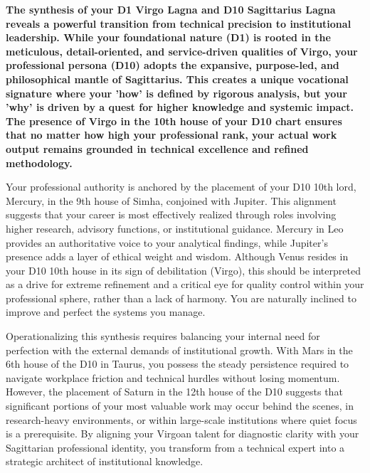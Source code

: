 
\label{topic31}

{\fontsize{9.5}{13.8}\selectfont\bfseries\color{DeepSlate} The synthesis of your D1 Virgo Lagna and D10 Sagittarius Lagna reveals a powerful transition from technical precision to institutional leadership. While your foundational nature (D1) is rooted in the meticulous, detail-oriented, and service-driven qualities of Virgo, your professional persona (D10) adopts the expansive, purpose-led, and philosophical mantle of Sagittarius. This creates a unique vocational signature where your 'how' is defined by rigorous analysis, but your 'why' is driven by a quest for higher knowledge and systemic impact. The presence of Virgo in the 10th house of your D10 chart ensures that no matter how high your professional rank, your actual work output remains grounded in technical excellence and refined methodology.}\par\vspace{2mm}

{\fontsize{9}{13}\selectfont Your professional authority is anchored by the placement of your D10 10th lord, Mercury, in the 9th house of Simha, conjoined with Jupiter. This alignment suggests that your career is most effectively realized through roles involving higher research, advisory functions, or institutional guidance. Mercury in Leo provides an authoritative voice to your analytical findings, while Jupiter's presence adds a layer of ethical weight and wisdom. Although Venus resides in your D10 10th house in its sign of debilitation (Virgo), this should be interpreted as a drive for extreme refinement and a critical eye for quality control within your professional sphere, rather than a lack of harmony. You are naturally inclined to improve and perfect the systems you manage.}\par\vspace{1.8mm}

{\fontsize{9}{13}\selectfont Operationalizing this synthesis requires balancing your internal need for perfection with the external demands of institutional growth. With Mars in the 6th house of the D10 in Taurus, you possess the steady persistence required to navigate workplace friction and technical hurdles without losing momentum. However, the placement of Saturn in the 12th house of the D10 suggests that significant portions of your most valuable work may occur behind the scenes, in research-heavy environments, or within large-scale institutions where quiet focus is a prerequisite. By aligning your Virgoan talent for diagnostic clarity with your Sagittarian professional identity, you transform from a technical expert into a strategic architect of institutional knowledge.}\par\vspace{1.8mm}

